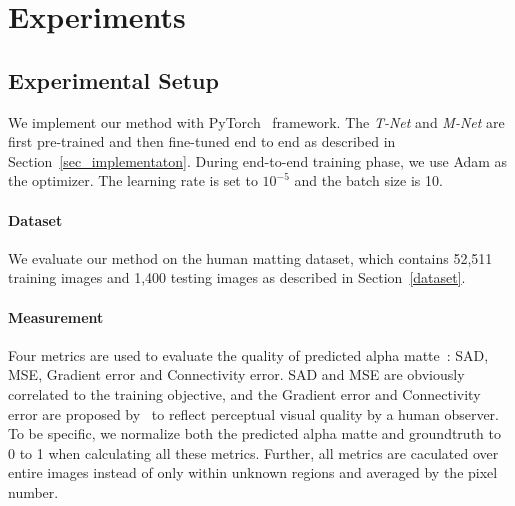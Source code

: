 \begin{comment}
3. T-M fusion layer takes the predicted trimaps and raw alpha mattes of the small image patches as inputs and outputs final alpha mattes. we compute alpha predict loss $L_{f}^{\alpha}$ and compositional loss $L_{f}^{c}$ on the small image patches, while trimap cross entropy loss $L_{f}^{t}$ on the large image patches.

We use adam as our optimizer and set the learning rate to $10^{-5}$ unchanged during the end to end training.

\end{comment}


\section{Experiments}

\subsection{Experimental Setup}

We implement our method with PyTorch~\cite{paszke2017automatic} framework.
The \emph{T-Net} and \emph{M-Net} are first pre-trained and then fine-tuned end to end as described in Section~\ref{sec_implementaton}.
During end-to-end training phase,  we use Adam as the optimizer.
The learning rate is set to $10^{-5}$ and the batch size is 10.

\paragraph{\textbf{Dataset}}

We evaluate our method on the human matting dataset, which contains 52,511 training images and 1,400 testing images as described in Section~\ref{dataset}.


\paragraph{\textbf{Measurement}}

Four metrics are used to evaluate the quality of predicted alpha matte~\cite{rhemann2009perceptually}: SAD, MSE, Gradient error and Connectivity error.
SAD and MSE are obviously correlated to the training objective, and the Gradient  error and Connectivity error are proposed by~\cite{rhemann2009perceptually} to reflect perceptual visual quality by a human observer.
To be specific, we normalize both the predicted alpha matte and groundtruth to 0 to 1 when calculating all these metrics.
Further, all metrics are caculated over entire images instead of only within unknown regions and averaged by the pixel number.

